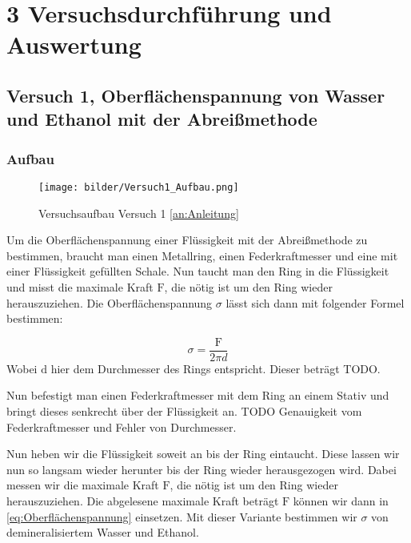 \chapter*{3 Versuchsdurchführung und Auswertung}
\setcounter{chapter}{3}
\setcounter{section}{0}
\setcounter{subsection}{0}
 
    \section{Versuch 1, Oberflächenspannung von Wasser und Ethanol mit der Abreißmethode}
    \label{sec:Versuch1}

        \subsection{Aufbau}

            \begin{figure}[H]
                \centering
                \texttt{[image: bilder/Versuch1\_Aufbau.png]}
                \caption{Versuchsaufbau Versuch 1 \ref{an:Anleitung}}
                \label{fig:Versuch1_Aufbau}
            \end{figure}

            Um die Oberflächenspannung einer Flüssigkeit mit der Abreißmethode zu bestimmen,
            braucht man einen Metallring, einen Federkraftmesser und eine mit einer Flüssigkeit gefüllten Schale. Nun taucht man den Ring in die Flüssigkeit und misst die maximale Kraft $\mathrm{F}$, die nötig ist um den Ring wieder herauszuziehen. Die Oberflächenspannung $\sigma$ lässt sich dann mit folgender Formel bestimmen:

            \begin{equation}
                \sigma = \frac{\mathrm{F}}{2\pi d}
                \label{eq:Oberflächenspannung}
            \end{equation}
            Wobei $\mathrm{d}$ hier dem Durchmesser des Rings entspricht. Dieser beträgt TODO.
            
            Nun befestigt man einen Federkraftmesser mit dem Ring an einem Stativ und bringt dieses senkrecht über der Flüssigkeit an. TODO Genauigkeit vom Federkraftmesser und Fehler von Durchmesser. 

            \noindent Nun heben wir die Flüssigkeit soweit an bis der Ring eintaucht. Diese lassen wir nun so langsam wieder herunter bis der Ring wieder herausgezogen wird. Dabei messen wir die maximale Kraft $\mathrm{F}$, die nötig ist um den Ring wieder herauszuziehen. Die abgelesene maximale Kraft beträgt $\mathrm{F}$ können wir dann in \ref{eq:Oberflächenspannung} einsetzen. Mit dieser Variante bestimmen wir $\sigma$ von demineralisiertem Wasser und Ethanol.

